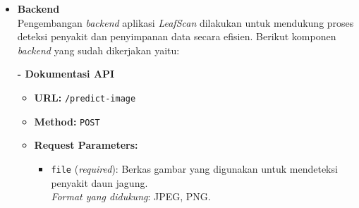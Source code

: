 \documentclass[journal,article,submit,pdftex,moreauthors]{Definitions/mdpi}
\begin{document}
\begin{itemize}
    \item \textbf{Backend} \\
    Pengembangan \textit{backend} aplikasi \textit{LeafScan} dilakukan untuk mendukung proses deteksi penyakit dan penyimpanan data secara efisien. Berikut komponen \textit{backend} yang sudah dikerjakan yaitu:

    \textbf{- Dokumentasi API}

    \begin{itemize}[left=0pt, label={}]
        \item \textbf{URL:} \texttt{/predict-image}
        \item \textbf{Method:} \texttt{POST}
        \item \textbf{Request Parameters:}
        \begin{itemize}
            \item \texttt{file} (\textit{required}): Berkas gambar yang digunakan untuk mendeteksi penyakit daun jagung. \\
            \textit{Format yang didukung}: JPEG, PNG.
        \end{itemize}
    

\end{itemize}
\end{itemize}
\end{document}
